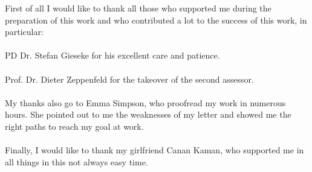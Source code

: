 
First of all I would like to thank all those who supported me during the preparation of this work and who contributed a lot to the success of this work, in particular:\\
\\
PD Dr. Stefan Gieseke for his excellent care and patience.\\
\\
Prof. Dr. Dieter Zeppenfeld for the takeover of the second assessor.\\
\\
My thanks also go to Emma Simpson, who proofread my work in numerous hours. She pointed out to me the weaknesses of my letter and showed me the right paths to reach my goal at work.\\
\\ 
Finally, I would like to thank my girlfriend Canan Kaman, who supported me in all things in this not always easy time.\\


 
         

